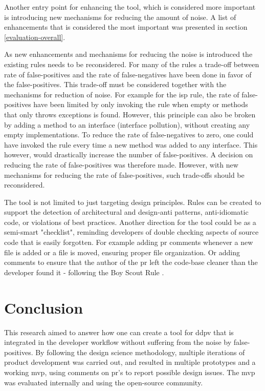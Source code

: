 \documentclass[pdftex,10pt,b5paper,twoside]{report}
\begin{document}
Another entry point for enhancing the tool, which is considered more important is introducing new mechanisms for reducing the amount of noise. A list of enhancements that is considered the most important was presented in section \ref{evaluation-overall}. 

As new enhancements and mechanisms for reducing the noise is introduced the existing rules needs to be reconsidered. For many of the rules a trade-off between rate of false-positives and the rate of false-negatives have been done in favor of the false-positives. This trade-off must be considered together with the mechanisms for reduction of noise. For example for the \gls{isp} rule, the rate of false-positives have been limited by only invoking the rule when empty or methods that only throws exceptions is found. However, this principle can also be broken by adding a method to an interface (interface pollution), without creating any empty implementations. To reduce the rate of false-negatives to zero, one could have invoked the rule every time a new method was added to any interface. This however, would drastically increase the number of false-positives. A decision on reducing the rate of false-positives was therefore made. However, with new mechanisms for reducing the rate of false-positives, such trade-offs should be reconsidered. 

The tool is not limited to just targeting design principles. Rules can be created to support the detection of architectural and design-anti patterns, anti-idiomatic code, or violations of best practices. Another direction for the tool could be as a semi-smart "checklist", reminding developers of double checking aspects of source code that is easily forgotten. For example adding \gls{pr} comments whenever a new file is added or a file is moved, ensuring proper file organization. Or adding comments to ensure that the author of the \gls{pr} left the code-base cleaner than the developer found it - following the Boy Scout Rule \cite{boy-scout}.

\section{Conclusion}
\label{conclusion}


This research aimed to answer how one can create a tool for \gls{ddpv} that is integrated in the developer workflow without suffering from the noise by false-positives. By following the design science methodology, multiple iterations of product development was carried out, and resulted in multiple prototypes and a working \gls{mvp}, using comments on \gls{pr}'s to report possible design issues. The \gls{mvp} was evaluated internally and using the open-source community. 
\end{document}
